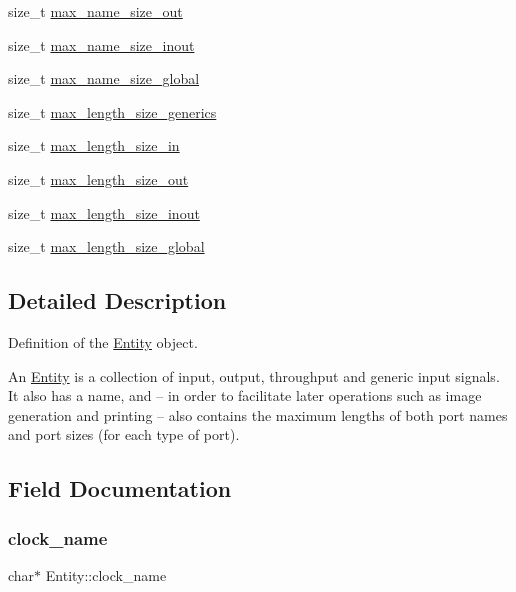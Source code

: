 \begin{DoxyCompactItemize}
\item 
size\+\_\+t \mbox{\hyperlink{struct_entity_ade510913e1937e285e677c2b281cb09e}{max\+\_\+name\+\_\+size\+\_\+out}}
\item 
size\+\_\+t \mbox{\hyperlink{struct_entity_a33a2fca24ecaee57aaf1b2416463e1bd}{max\+\_\+name\+\_\+size\+\_\+inout}}
\item 
size\+\_\+t \mbox{\hyperlink{struct_entity_a5066a9a519892bae3522583614ad4265}{max\+\_\+name\+\_\+size\+\_\+global}}
\item 
size\+\_\+t \mbox{\hyperlink{struct_entity_a9822957e550360cb5cddf1c39bb02f7c}{max\+\_\+length\+\_\+size\+\_\+generics}}
\item 
size\+\_\+t \mbox{\hyperlink{struct_entity_a3dc25f084d7d9f51ec16d4154d8d7153}{max\+\_\+length\+\_\+size\+\_\+in}}
\item 
size\+\_\+t \mbox{\hyperlink{struct_entity_aaac43fe338ec2162eb69ee47920f3363}{max\+\_\+length\+\_\+size\+\_\+out}}
\item 
size\+\_\+t \mbox{\hyperlink{struct_entity_a0833c90ebe1f08cc102e27d9a7ee87ff}{max\+\_\+length\+\_\+size\+\_\+inout}}
\item 
size\+\_\+t \mbox{\hyperlink{struct_entity_a36ae5682c01accd9d4335055ab0eca05}{max\+\_\+length\+\_\+size\+\_\+global}}
\end{DoxyCompactItemize}


\subsection{Detailed Description}
Definition of the \mbox{\hyperlink{struct_entity}{Entity}} object. 

An \mbox{\hyperlink{struct_entity}{Entity}} is a collection of input, output, throughput and generic input signals. It also has a name, and -- in order to facilitate later operations such as image generation and printing -- also contains the maximum lengths of both port names and port sizes (for each type of port). 

\subsection{Field Documentation}
\mbox{\label{struct_entity_a520135e0c9a911b9d09a47697c58b7ad}} 
\subsubsection{\texorpdfstring{clock\_name}{clock\_name}}
{\footnotesize\ttfamily char$\ast$ Entity\+::clock\+\_\+name}

